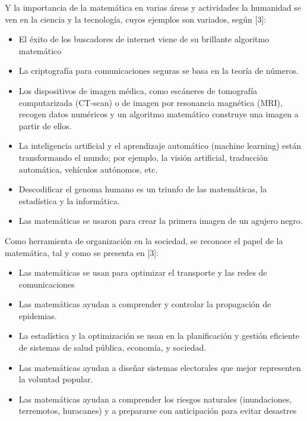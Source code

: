 Y la importancia de la matemática en varias áreas y actividades la humanidad se ven en la ciencia y la tecnología, cuyos ejemplos son variados, según [3]:

\begin{itemize}

  \color{blue}  \item \color{black} El éxito de los buscadores de internet viene de su brillante algoritmo matemático
    
   \color{blue} \item \color{black} La criptografía para comunicaciones seguras se basa en la teoría de números.   
    
    \color{blue} \item \color{black} Los dispositivos de imagen médica, como escáneres de tomografía computarizada (CT-scan) o de imagen por resonancia magnética (MRI), recogen datos numéricos y un algoritmo matemático construye una imagen a partir de ellos.   

    \color{blue} \item \color{black} La inteligencia artificial y el aprendizaje automático (machine learning) están transformando el mundo; por ejemplo, la visión artificial, traducción automática, vehículos autónomos, etc.
    
    \color{blue} \item \color{black} Descodificar el genoma humano es un triunfo de las matemáticas, la estadística y la informática.
    
    \color{blue} \item \color{black} Las matemáticas se usaron para crear la primera imagen de un agujero negro.
    
    \end{itemize}
    
    Como herramienta de organización en la sociedad, se reconoce el papel de la matemática,
tal y como se presenta en [3]:

\begin{itemize}
    
     \color{blue} \item \color{black} Las matemáticas se usan para optimizar el transporte y las redes de comunicaciones
    
    \color{blue} \item \color{black} Las matemáticas ayudan a comprender y controlar la propagación de epidemias. 
    
    \color{blue} \item \color{black} La estadística y la optimización se usan en la planificación y gestión eficiente de sistemas de salud pública, economía, y sociedad. 
    
    \color{blue} \item \color{black} Las matemáticas ayudan a diseñar sistemas electorales que mejor representen la voluntad popular.   
    
    \color{blue} \item \color{black} Las matemáticas ayudan a comprender los riesgos naturales (inundaciones,  terremotos,
huracanes) y a prepararse con anticipación para evitar desastres

\end{itemize}

